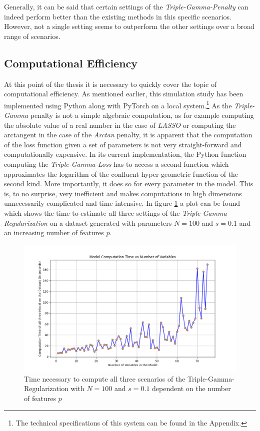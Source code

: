 \documentclass[12pt,a4paper]{article}
\begin{document}
Generally, it can be said that certain settings of the \textit{Triple-Gamma-Penalty} can indeed perform better than the existing methods in this specific scenarios. However, not a single setting seems to outperform the other settings over a broad range of scenarios. 


\newpage
\subsection{Computational Efficiency}
At this point of the thesis it is necessary to quickly cover the topic of computational efficiency. As mentioned earlier, this simulation study has been implemented using Python along with PyTorch on a local system.\footnote{The technical specifications of this system can be found in the Appendix.} As the \textit{Triple-Gamma} penalty is not a simple algebraic computation, as for example computing the absolute value of a real number in the case of \textit{LASSO} or computing the arctangent in the case of the \textit{Arctan} penalty, it is apparent that the computation of the loss function given a set of parameters is not very straight-forward and computationally expensive. In its current implementation, the Python function computing the \textit{Triple-Gamma-Loss} has to access a second function which approximates the logarithm of the confluent hyper-geometric  function of the second kind. More importantly, it does so for every parameter in the model. This is, to no surprise, very inefficient and makes computations in high dimensions unnecessarily complicated and time-intensive. In figure \ref{fig:ComputationTime} a plot can be found which shows the time to estimate all three settings of the \textit{Triple-Gamma-Regularization} on a dataset generated with parameters $N=100$ and $s=0.1$ and an increasing number of features $p$.\\

\begin{figure}[H]
\centering
\includegraphics[scale=0.6]{../02_simulation/021_simulation_figures/ComputationTime_Example.png}
\caption{Time necessary to compute all three scenarios of the Triple-Gamma-Regularization with $N=100$ and $s=0.1$ dependent on the number of features $p$}
\label{fig:ComputationTime}
\end{figure} 	
\end{document}

